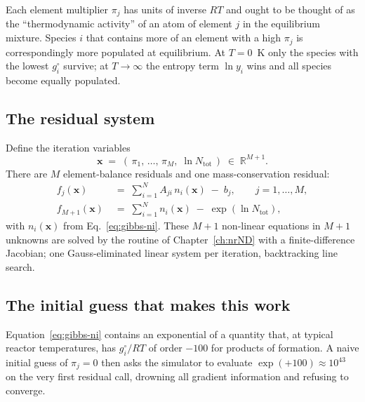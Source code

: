\documentclass[11pt,a4paper]{article}
\newcommand{\R}{\mathbb{R}}
\begin{document}
\begin{intuition}
Each element multiplier $\pi_j$ has units of inverse $RT$ and ought
to be thought of as the ``thermodynamic activity'' of an atom of
element $j$ in the equilibrium mixture.  Species $i$ that contains
more of an element with a high $\pi_j$ is correspondingly more
populated at equilibrium.  At $T = 0$~K only the species with the
lowest $g_i^{\circ}$ survive; at $T \to \infty$ the entropy term
$\ln y_i$ wins and all species become equally populated.
\end{intuition}

\subsection{The residual system}

Define the iteration variables
\begin{equation}
   \mathbf{x} \;=\; (\,\pi_1,\,\dots,\,\pi_M,\;\ln N_{\mathrm{tot}}\,)
   \;\in\; \R^{M+1}.
\end{equation}
There are $M$ element-balance residuals and one mass-conservation
residual:
\begin{align}
   f_j(\mathbf{x}) &\;=\;
     \sum_{i=1}^{N} A_{ji}\,n_i(\mathbf{x}) \;-\; b_j,
     \qquad j = 1, \dots, M, \label{eq:gibbs-fj}\\
   f_{M+1}(\mathbf{x}) &\;=\;
     \sum_{i=1}^{N} n_i(\mathbf{x}) \;-\; \exp(\ln N_{\mathrm{tot}}),
     \label{eq:gibbs-fM1}
\end{align}
with $n_i(\mathbf{x})$ from Eq.~\eqref{eq:gibbs-ni}.  These $M+1$
non-linear equations in $M+1$ unknowns are solved by the
 routine of Chapter~\ref{ch:nrND}
with a finite-difference Jacobian; one Gauss-eliminated linear
system per iteration, backtracking line search.

\subsection{The initial guess that makes this work}

Equation~\eqref{eq:gibbs-ni} contains an exponential of a quantity
that, at typical reactor temperatures, has $g_i^{\circ}/RT$ of order
$-100$ for products of formation.  A naive initial guess of $\pi_j
= 0$ then asks the simulator to evaluate $\exp(+100) \approx 10^{43}$
on the very first residual call, drowning all gradient information
and refusing to converge.
\end{document}
